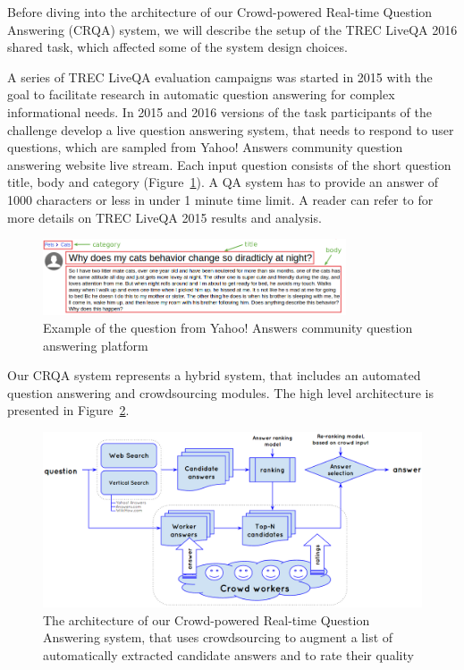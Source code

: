 
Before diving into the architecture of our Crowd-powered Real-time Question Answering (CRQA) system, we will describe the setup of the TREC LiveQA 2016 shared task, which affected some of the system design choices.

A series of TREC LiveQA evaluation campaigns was started in 2015 with the goal to facilitate research in automatic question answering for complex informational needs.
In 2015 and 2016 versions of the task participants of the challenge develop a live question answering system, that needs to respond to user questions, which are sampled from Yahoo! Answers community question answering website live stream.
Each input question consists of the short question title, body and category (Figure~\ref{fig:ya_question}).
A QA system has to provide an answer of 1000 characters or less in under 1 minute time limit.
A reader can refer to \cite{agichtein2015overview} for more details on TREC LiveQA 2015 results and analysis.

\begin{figure}[h!t]
	\centering
	\includegraphics[width=0.8\textwidth]{img/ya_question}
	\caption{Example of the question from Yahoo! Answers community question answering platform}
	\label{fig:ya_question}
\end{figure}

Our CRQA system represents a hybrid system, that includes an automated question answering and crowdsourcing modules.
The high level architecture is presented in Figure~\ref{fig:system}.

\begin{figure}[h!t]
	\centering
	\includegraphics[width=\textwidth]{img/system}
	\caption{The architecture of our Crowd-powered Real-time Question Answering system, that uses crowdsourcing to augment a list of automatically extracted candidate answers and to rate their quality}
	\label{fig:system}
\end{figure}

